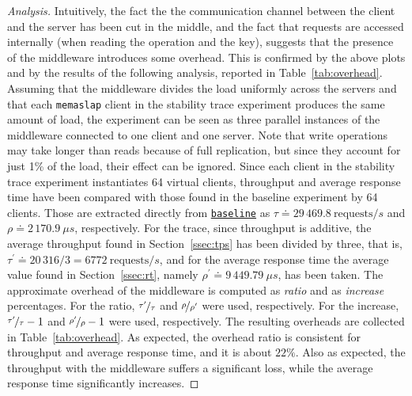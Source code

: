 \documentclass[11pt]{article}
\theoremstyle{definition}
\newenvironment{ana}[1][\proofname]{\begin{proof}[Analysis]}{\end{proof}}
\newcommand\p{^\prime}
\renewcommand\t\texttt
\begin{document}
\begin{ana}
    Intuitively, the fact the the communication channel between the client and the server has been cut in the middle, and the fact that requests are accessed internally (when reading the operation and the key), suggests that the presence of the middleware introduces some overhead.
    This is confirmed by the above plots and by the results of the following analysis, reported in Table~\ref{tab:overhead}.
    Assuming that the middleware divides the load uniformly across the servers and that each \t{memaslap} client in the stability trace experiment produces the same amount of load, the experiment can be seen as three parallel instances of the middleware connected to one client and one server.
    Note that write operations may take longer than reads because of full replication, but since they account for just 1\% of the load, their effect can be ignored.
    Since each client in the stability trace experiment instantiates 64 virtual clients, throughput and average response time have been compared with those found in the baseline experiment by 64 clients.
    Those are extracted directly from \hyperref[f:baseline]{\t{baseline}} as $\tau\doteq29\,469.8\ \textrm{requests}/s$ and $\rho\doteq2\,170.9\ \mu s$, respectively.
    For the trace, since throughput is additive, the average throughput found in Section~\ref{ssec:tps} has been divided by three, that is, $\tau\p\doteq20\,316/3=6772\ \textrm{requests}/s$, and for the average response time the average value found in Section~\ref{ssec:rt}, namely $\rho\p\doteq9\,449.79\ \mu s$, has been taken.
    The approximate overhead of the middleware is computed as \emph{ratio} and as \emph{increase} percentages.
    For the ratio, $\nicefrac{\tau\p}{\tau}$ and $\nicefrac{\rho}{\rho\p}$ were used, respectively.
    For the increase, $\nicefrac{\tau\p}{\tau}-1$ and $\nicefrac{\rho\p}{\rho}-1$ were used, respectively.
    The resulting overheads are collected in Table~\ref{tab:overhead}.
    As expected, the overhead ratio is consistent for throughput and average response time, and it is about $22\%$.
    Also as expected, the throughput with the middleware suffers a significant loss, while the average response time significantly increases.
\end{ana}
\end{document}
